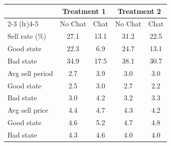 \begingroup
\centering
\small
\begin{tabular}{lcccc}
\toprule
 & \multicolumn{2}{c}{Treatment 1} & \multicolumn{2}{c}{Treatment 2} \\
\cmidrule(lr){2-3} \cmidrule(lr){4-5}
 & No Chat & Chat & No Chat & Chat \\
\midrule
  Sell rate (\%) & 27.1 & 13.1 & 31.2 & 22.5 \\
  \quad Good state & 22.3 & 6.9 & 24.7 & 13.1 \\
  \quad Bad state & 34.9 & 17.5 & 38.1 & 30.7 \\
\midrule
  Avg sell period & 2.7 & 3.9 & 3.0 & 3.0 \\
  \quad Good state & 2.5 & 3.0 & 2.7 & 2.2 \\
  \quad Bad state & 3.0 & 4.2 & 3.2 & 3.3 \\
\midrule
  Avg sell price & 4.4 & 4.7 & 4.3 & 4.2 \\
  \quad Good state & 4.6 & 5.2 & 4.7 & 4.8 \\
  \quad Bad state & 4.3 & 4.6 & 4.0 & 4.0 \\
\bottomrule
\end{tabular}
\endgroup
